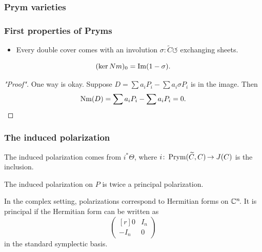 \begin{frame}
\frametitle{Prym varieties}



\end{frame}


\begin{frame}
\frametitle{First properties of Pryms}

\begin{itemize}
	\item Every double cover comes with an involution $\sigma \colon  \widetilde C \circlearrowleft$ exchanging sheets.
\end{itemize}


\begin{proposition}
\[
(\ker Nm)_0 = \operatorname{Im}(1-\sigma).
\]
\end{proposition}
\begin{proof}["Proof"]
One way is okay. Suppose $D= \sum a_i P_i - \sum a_i \sigma{P_i}$ is in the image. Then
\[
\operatorname{Nm}(D) = \sum a_i P_i - \sum a_i P_i = 0.
\]
\end{proof}
\end{frame}

\begin{frame}
\frametitle{The induced polarization}

The induced polarization comes from \alert{$i^\ast \Theta$}, where $i\colon\operatorname{Prym}(\widetilde C, C )\mkern-2mu \to J(C)$ is the inclusion.

\begin{theorem}
The induced polarization on $P$ is twice a principal polarization.
\end{theorem}
\pause
\begin{remark}
In the complex setting, polarizations correspond to Hermitian forms on $\mathbb{C}^n\mkern-3mu$. It is principal if the Hermitian form can be written as 
\[
\begin{pmatrix*}[r]
0 & I_n \\
-I_n &0
\end{pmatrix*}
\]
in the standard symplectic basis.
\end{remark}
\end{frame}

